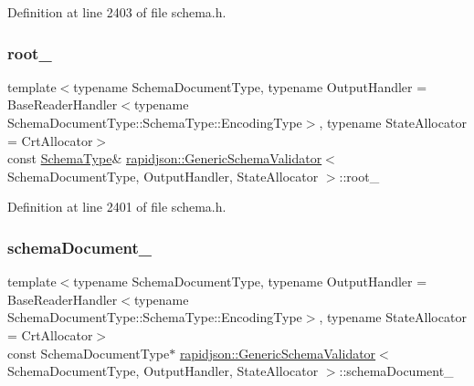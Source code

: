 Definition at line 2403 of file schema.\+h.

\mbox{\label{classrapidjson_1_1_generic_schema_validator_a3590ac2591e4b33550c708bbf6351161}} 
\subsubsection{\texorpdfstring{root\_}{root\_}}
{\footnotesize\ttfamily template$<$typename Schema\+Document\+Type, typename Output\+Handler = Base\+Reader\+Handler$<$typename Schema\+Document\+Type\+::\+Schema\+Type\+::\+Encoding\+Type$>$, typename State\+Allocator = Crt\+Allocator$>$ \\
const \mbox{\hyperlink{classrapidjson_1_1_generic_schema_validator_a0619c9faf3014ef141d1c6d05ae04ddc}{Schema\+Type}}\& \mbox{\hyperlink{classrapidjson_1_1_generic_schema_validator}{rapidjson\+::\+Generic\+Schema\+Validator}}$<$ Schema\+Document\+Type, Output\+Handler, State\+Allocator $>$\+::root\+\_\+\hspace{0.3cm}{\ttfamily [private]}}



Definition at line 2401 of file schema.\+h.

\mbox{\label{classrapidjson_1_1_generic_schema_validator_aef3aea9b0dd2710cff32aa4f49e58582}} 
\subsubsection{\texorpdfstring{schemaDocument\_}{schemaDocument\_}}
{\footnotesize\ttfamily template$<$typename Schema\+Document\+Type, typename Output\+Handler = Base\+Reader\+Handler$<$typename Schema\+Document\+Type\+::\+Schema\+Type\+::\+Encoding\+Type$>$, typename State\+Allocator = Crt\+Allocator$>$ \\
const Schema\+Document\+Type$\ast$ \mbox{\hyperlink{classrapidjson_1_1_generic_schema_validator}{rapidjson\+::\+Generic\+Schema\+Validator}}$<$ Schema\+Document\+Type, Output\+Handler, State\+Allocator $>$\+::schema\+Document\+\_\+\hspace{0.3cm}{\ttfamily [private]}}



